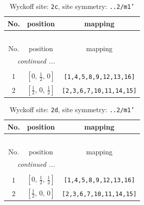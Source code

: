 \documentclass[fleqn,8pt]{jsarticle}
\begin{document}
\renewcommand{\arraystretch}{1.2}
\begin{longtable}{ccc}
\caption{Wyckoff site: {\tt 2c}, site symmetry: {\tt ..2/m1'}}
 \\
 \hline \hline
No. & position & mapping \\ \hline \endfirsthead

\multicolumn{2}{l}{\tablename\ \thetable{}} \\
 \hline \hline
No. & position & mapping \\ \hline \endhead

 \hline \hline
\multicolumn{2}{r}{\footnotesize\it continued ...} \\ \endfoot

 \hline \hline
\multicolumn{2}{r}{} \\ \endlastfoot

1 & $\left[ 0,\, \frac{1}{2},\, 0 \right]$ & {\tt [1,4,5,8,9,12,13,16]} \\ \hline
2 & $\left[ \frac{1}{2},\, 0,\, \frac{1}{2} \right]$ & {\tt [2,3,6,7,10,11,14,15]} \\
\end{longtable}
\renewcommand{\arraystretch}{1.2}
\begin{longtable}{ccc}
\caption{Wyckoff site: {\tt 2d}, site symmetry: {\tt ..2/m1'}}
 \\
 \hline \hline
No. & position & mapping \\ \hline \endfirsthead

\multicolumn{2}{l}{\tablename\ \thetable{}} \\
 \hline \hline
No. & position & mapping \\ \hline \endhead

 \hline \hline
\multicolumn{2}{r}{\footnotesize\it continued ...} \\ \endfoot

 \hline \hline
\multicolumn{2}{r}{} \\ \endlastfoot

1 & $\left[ 0,\, \frac{1}{2},\, \frac{1}{2} \right]$ & {\tt [1,4,5,8,9,12,13,16]} \\ \hline
2 & $\left[ \frac{1}{2},\, 0,\, 0 \right]$ & {\tt [2,3,6,7,10,11,14,15]} \\
\end{longtable}
\renewcommand{\arraystretch}{1.2}
\end{document}
